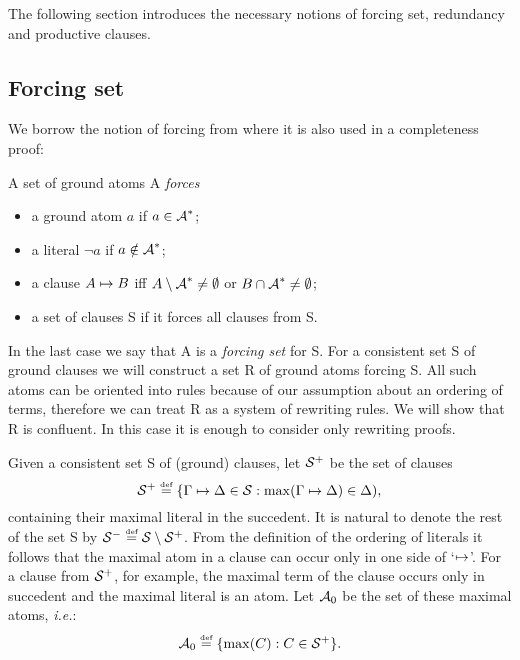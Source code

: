 The following section introduces the necessary notions of forcing set,
redundancy and productive clauses.

\subsection{Forcing set} \label{se:forcing-set}

We borrow the notion of forcing from \cite{PP} where it is also used in a
completeness proof:
\begin{DEFINITION} \label{def:forcing}
A set of ground atoms \C A {\em forces}
\begin{itemize}\MyLPar
\item  a ground atom $a$ if \(a\in\mbox{$\cal A$}^\ast\);
\item  a literal $\neg a$ if \(a\notin\mbox{$\cal A$}^\ast\);
\item  a clause $A\mathrel{\mapsto} B$ iff \(A\setminus \mbox{$\cal A$}^\ast\ne\emptyset\) or \(B \cap \mbox{$\cal A$}^\ast\ne\emptyset\);
\item  a set of clauses \C S if it forces all clauses from \C S.
\end{itemize}
\end{DEFINITION}

In the last case we say that \C A is a {\em forcing set} for \C S.
For a consistent set \C S of ground clauses we will construct a set \C R of
ground atoms forcing \C S. 
All such atoms can be oriented into rules because of our assumption about an
ordering of terms, therefore we can treat \C R  as a
system of rewriting rules. We will show that \C R is confluent. In this case
it is enough to consider only rewriting proofs.

Given a consistent set \C S of (ground) clauses, let ${\cal S}^{+}$ be the set of
clauses
\begin{equation} \label{eq:S+}
{\cal S}^{+} \mathrel{\stackrel{\mbox{\tiny def}}{=}} 
\{\Gamma\mathrel{\mapsto} \Delta\in \mbox{$\cal S$}: \max(\Gamma\mathrel{\mapsto} \Delta)\in\Delta),
\end{equation}
containing their maximal literal in the succedent. It is natural to denote
the rest of the set \C S by  \({\cal S}^{-}\mathrel{\stackrel{\mbox{\tiny def}}{=}} \mbox{$\cal S$}\setminus{\cal S}^{+}\).
From the definition of
the ordering of literals it follows that the maximal atom in a clause can
occur only in one side of `$\mathrel{\mapsto}$'. For a clause from \({\cal S}^{+}\), for example,
the maximal term of the clause occurs only in succedent and the maximal
literal is an atom.  Let $\mbox{$\cal A$}_0$ be the set of these maximal atoms, {\em
i.e.}:
\begin{equation} \label{eq:max-atoms-set}
\mbox{$\cal A$}_0 \mathrel{\stackrel{\mbox{\tiny def}}{=}} \{\max(C) : C\in {\cal S}^{+}\}.
\end{equation}

